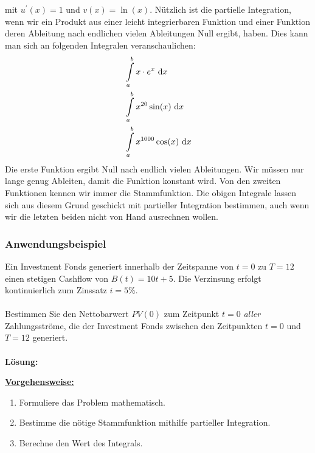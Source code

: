 mit $u^\prime(x) = 1 $ und $v(x) = \ln(x) $.
Nützlich ist die partielle Integration, wenn wir ein Produkt aus einer leicht integrierbaren Funktion und einer Funktion deren Ableitung nach endlichen vielen Ableitungen Null ergibt, haben.
Dies kann man sich an folgenden Integralen veranschaulichen:
\begin{align*}
&\int \limits_a^b x \cdot e^x \ \text{\rmfamily d} x\\
&\int \limits_a^b x^{20} \sin(x) \ \text{\rmfamily d} x\\
&\int \limits_a^b x^{1000} \cos(x) \ \text{\rmfamily d} x
\end{align*}
Die erste Funktion ergibt Null nach endlich vielen Ableitungen.
Wir müssen nur lange genug Ableiten, damit die Funktion konstant wird.
Von den zweiten Funktionen kennen wir immer die Stammfunktion.
Die obigen Integrale lassen sich aus diesem Grund geschickt mit partieller Integration bestimmen, auch wenn wir die letzten beiden nicht von Hand ausrechnen wollen.

\subsubsection*{Anwendungsbeispiel}
Ein Investment Fonds generiert innerhalb der Zeitspanne von $t=0$ zu $T=12$ einen
stetigen Cashflow von $B(t) = 10 t + 5$.
Die Verzinsung erfolgt kontinuierlich zum Zinssatz $i = 5 \%$.
\\
\\
Bestimmen Sie den Nettobarwert $PV(0)$ zum Zeitpunkt $t = 0$ \textit{aller} Zahlungsströme,
die der Investment Fonds zwischen den Zeitpunkten $t = 0$ und $T = 12$ generiert.\\
\\
\textbf{Lösung:}
\begin{mdframed}
\underline{\textbf{Vorgehensweise:}}
\begin{enumerate}
\item Formuliere das Problem mathematisch.
\item Bestimme die nötige Stammfunktion mithilfe partieller Integration.
\item Berechne den Wert des Integrals.
\end{enumerate}
\end{mdframed}

